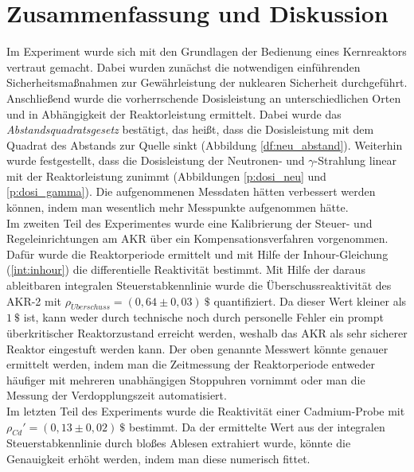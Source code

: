 \section{Zusammenfassung und Diskussion}
	Im Experiment wurde sich mit den Grundlagen der Bedienung eines Kernreaktors vertraut gemacht. Dabei wurden zunächst die notwendigen einführenden Sicherheitsmaßnahmen zur Gewährleistung der nuklearen Sicherheit durchgeführt. Anschließend wurde die vorherrschende Dosisleistung an unterschiedlichen Orten und in Abhängigkeit der Reaktorleistung ermittelt. Dabei wurde das \textit{Abstandsquadratsgesetz} bestätigt, das heißt, dass die Dosisleistung mit dem Quadrat des Abstands zur Quelle sinkt (Abbildung \ref{df:neu_abstand}). Weiterhin wurde festgestellt, dass die Dosisleistung der Neutronen- und $\gamma$-Strahlung linear mit der Reaktorleistung zunimmt (Abbildungen \ref{p:dosi_neu} und \ref{p:dosi_gamma}). Die aufgenommenen Messdaten hätten verbessert werden können, indem man wesentlich mehr Messpunkte aufgenommen hätte.\\
	Im zweiten Teil des Experimentes wurde eine Kalibrierung der Steuer- und Regeleinrichtungen am AKR über ein Kompensationsverfahren vorgenommen. Dafür wurde die Reaktorperiode ermittelt und mit Hilfe der Inhour-Gleichung (\ref{int:inhour}) die differentielle Reaktivität bestimmt. Mit Hilfe der daraus ableitbaren integralen Steuerstabkennlinie wurde die Überschussreaktivität des AKR-2 mit $ \rho_{\ddot{U}berschuss}  = (0,64 \pm 0,03)\ \unit{\$}$ quantifiziert. Da dieser Wert kleiner als $1\ \unit{\$}$ ist, kann weder durch technische noch durch personelle Fehler ein prompt überkritischer Reaktorzustand erreicht werden, weshalb das AKR als sehr sicherer Reaktor eingestuft werden kann. Der oben genannte Messwert könnte genauer ermittelt werden, indem man die Zeitmessung der Reaktorperiode entweder häufiger mit mehreren unabhängigen Stoppuhren vornimmt oder man die Messung der Verdopplungszeit automatisiert.\\
	Im letzten Teil des Experiments wurde die Reaktivität einer Cadmium-Probe mit $\rho_{Cd}\prime = (0,13 \pm 0,02)\ \unit{\$}$ bestimmt. Da der ermittelte Wert aus der integralen Steuerstabkennlinie durch bloßes Ablesen extrahiert wurde, könnte die Genauigkeit erhöht werden, indem man diese numerisch fittet.
